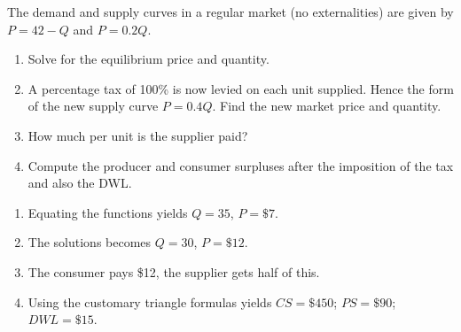 \begin{enumialphparenastyle}
\begin{ex}\label{ex:ch5ex17}
The demand and supply curves in a regular market (no externalities) are given by $P=42-Q$ and $P=0.2Q$.
\begin{enumerate}
	\item	Solve for the equilibrium price and quantity.
	\item	A percentage tax of 100\% is now levied on each unit supplied. Hence the form of the new supply curve $P=0.4Q$. Find the new market price and quantity.
	\item	How much per unit is the supplier paid?
	\item	Compute the producer and consumer surpluses after the imposition of the tax and also the DWL.
\end{enumerate}
\begin{sol}
\begin{enumerate}
	\item	Equating the functions yields $Q=35$, $P=\$7$.
	\item	The solutions becomes $Q=30$, $P=\$12$.
	\item	The consumer pays \$12, the supplier gets half of this.
	\item	Using the customary triangle formulas yields $CS=\$450$; $PS=\$90$; $DWL=\$15$.
\end{enumerate}
\end{sol}
\end{ex}


\end{enumialphparenastyle}